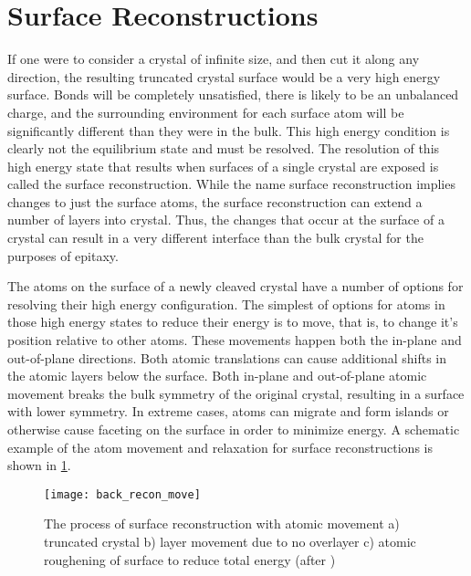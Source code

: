 \section{Surface Reconstructions}\label{sec:reconstruction}
If one were to consider a crystal of infinite size, and then cut it along any direction, the resulting truncated crystal surface would be a very high energy surface. Bonds will be completely unsatisfied, there is likely to be an unbalanced charge, and the surrounding environment for each surface atom will be significantly different than they were in the bulk. This high energy condition is clearly not the equilibrium state and must be resolved. The resolution of this high energy state that results when surfaces of a single crystal are exposed is called the surface reconstruction. While the name surface reconstruction implies changes to just the surface atoms, the surface reconstruction can extend a number of layers into crystal. Thus, the changes that occur at the surface of a crystal can result in a very different interface than the bulk crystal for the purposes of epitaxy.

The atoms on the surface of a newly cleaved crystal have a number of options for resolving their high energy configuration. The simplest of options for atoms in those high energy states to reduce their energy is to move, that is, to change it's position relative to other atoms. These movements happen both the in-plane and out-of-plane directions. Both atomic translations can cause additional shifts in the atomic layers below the surface.  Both in-plane and out-of-plane atomic movement breaks the bulk symmetry of the original crystal, resulting in a surface with lower symmetry. In extreme cases, atoms can migrate and form islands or otherwise cause faceting on the surface in order to minimize energy\cite{Duke1996,oura2010surface}. A schematic example of the atom movement and relaxation for surface reconstructions is shown in \cref{fig:back_recon_move}.
\begin{figure}
    \centering
    \texttt{[image: back\_recon\_move]}
    \caption[Simple surface reconstruction]{\label{fig:back_recon_move}The process of surface reconstruction with atomic movement a) truncated crystal b) layer movement due to no overlayer c) atomic roughening of surface to reduce total energy (after \cite{ohring2001materials})}
\end{figure}

